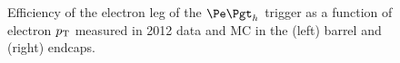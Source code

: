 \begin{figure}[htb]
\caption{Efficiency of the electron leg of the $\etau$ trigger as a function of electron $p_{\mathrm{T}}$ measured
in 2012 data and MC in the (left) barrel and (right) endcaps.}
\label{fig:electrontrg}
\end{figure}

